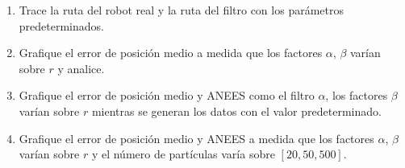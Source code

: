 \documentclass[tp]{lcc}
\begin{document}
	\begin{enumerate}
		\item Trace la ruta del robot real y la ruta del filtro con los parámetros predeterminados.
		\item Grafique el error de posición medio a medida que los factores $\alpha$, $\beta$ varían sobre $r$ y analice.
		\item Grafique el error de posición medio y ANEES como el filtro $\alpha$, los factores $\beta$ varían sobre $r$ mientras se generan los datos
		con el valor predeterminado.
		\item Grafique el error de posición medio y ANEES a medida que los factores $\alpha$, $\beta$ varían sobre $r$ y el número de partículas varía
		sobre $[20, 50, 500]$.
	\end{enumerate}


	\printbibliography
	
\end{document}
